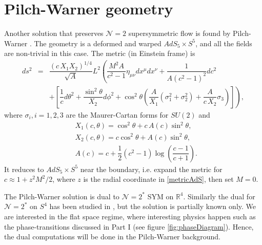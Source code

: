 \section{Pilch-Warner geometry}
Another solution that preserves $\mathcal{N}=2$ supersymmetric flow is found by Pilch-Warner \cite{Pilch:2000ue}.
The geometry is a deformed and warped $AdS_5 \times S^5$, and all the fields are non-trivial in this case.
The metric (in Einstein frame) is
\begin{eqnarray}\label{metricPW}
 ds^2 & = & \dfrac{(c \, X_1 X_2)^{1/4}}{\sqrt{A}} L^2
	\left( 
	  \dfrac{M^2 A}{c^2-1} \eta_{\mu\nu}dx^\mu dx^\nu + \dfrac{1}{A (c^2-1)^2} dc^2 
	\right.\\
      & & +\left. \left[
		  \dfrac{1}{c} d\theta^2 + \dfrac{\sin^2\theta}{X_2} d\phi^2 
		  + \cos^2\theta  \left(\dfrac{A}{X_1}(\sigma_1^2 +\sigma_2^2) + \dfrac{A}{c \, X_2} \sigma_3 \right)  
		\right] 
        \right),\nonumber
\end{eqnarray}
where $\sigma_i, i=1,2,3$ are the Maurer-Cartan forms for $SU(2)$ and
\begin{eqnarray*}
 & X_1(c,\theta) =  \cos^2\theta + c\, A(c)  \sin^2\theta, \\
 &  X_2 (c,\theta)=  c \cos^2\theta + A(c)  \sin^2\theta, \\
 & A(c)  = c+\dfrac{1}{2}(c^2 - 1)\log\left(\dfrac{c-1}{c+1}\right).
\end{eqnarray*}
It reduces to $AdS_5 \times S^5$ near the boundary, i.e. expand the metric for $c \approx 1 + z^2 M^2/ 2$, 
where $z$ is the radial coordinate in \eqref{metricAdS}, then set $M=0$.

The Pilch-Warner solution is dual to $\mathcal{N}=2^*$ SYM on $\mathbb{R}^4$. 
Similarly the dual for $\mathcal{N}=2^*$ on $S^4$ has been studied in \cite{Bobev:2013cja},
but the solution is partially known only.
We are interested in the flat space regime, where interesting physics happen such as the phase-transitions discussed in Part I (see figure \ref{fig:phaseDiagram}).
Hence, the dual computations will be done in the Pilch-Warner background.





